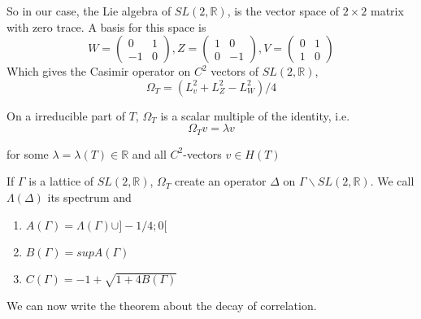 So in our case, the Lie algebra of $SL(2,\mathbb{R})$, is the vector space of $2 \times 2$ matrix with zero trace. A basis for this space is \[
W=\begin{pmatrix} 0 & 1 \\ -1 & 0 \end{pmatrix}, Z=\begin{pmatrix} 1 & 0 \\ 0 & -1 \end{pmatrix}, V=\begin{pmatrix} 0 & 1 \\ 1 & 0 \end{pmatrix}
\]
Which gives the Casimir operator on $C^2$ vectors of $SL(2,\mathbb{R})$, \[
\Omega_T = (L_v^2+L_Z^2-L_W^2)/4
\]

On a irreducible part of $T$, $\Omega_T$ is a scalar multiple of the identity, i.e. \[
\Omega_T v = \lambda v
\]

for some $\lambda=\lambda(T)\in \mathbb{R}$ and all $C^2$-vectors $v \in H(T)$

If $\Gamma$ is a lattice of $SL(2,\mathbb{R})$, $\Omega_T$ create an operator $\Delta$ on $\Gamma \backslash SL(2,\mathbb{R})$. We call $\Lambda(\Delta)$ its spectrum and
\begin{enumerate}
\item $A(\Gamma)=\Lambda(\Gamma) \cup ]-1/4;0[$
\item $B(\Gamma)=sup A(\Gamma)$
\item $C(\Gamma)= -1 + \sqrt{1+4 B(\Gamma)}$
\end{enumerate}

We can now write the theorem about the decay of correlation.

